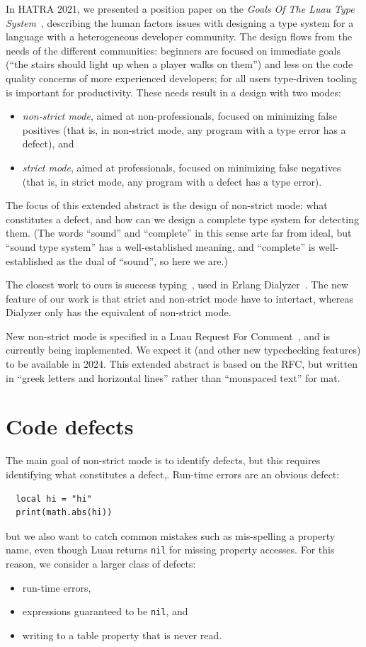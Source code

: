 \documentclass[sigplan]{acmart}
\begin{document}
In HATRA 2021, we presented a position paper on the \emph{Goals Of The Luau Type
System}~\cite{BFJ21:GoalsLuau}, describing the human factors issues
with designing a type system for a language with a heterogeneous
developer community. The design flows from the needs of the different
communities: beginners are focused on immediate goals (``the stairs
should light up when a player walks on them'') and less on the code
quality concerns of more experienced developers; for all users
type-driven tooling is important for productivity. These needs result in a design with two modes:
\begin{itemize}
\item \emph{non-strict mode}, aimed at non-professionals, focused on
  minimizing false positives (that is, in non-strict mode, any program with a type error has a defect), and
\item \emph{strict mode}, aimed at professionals, focused on
  minimizing false negatives (that is, in strict mode, any program with a defect has a type error).
\end{itemize}
The focus of this extended abstract is the design of non-strict mode: what constitutes
a defect, and how can we design a complete type system for detecting them.
(The words ``sound'' and ``complete'' in this sense arte far from ideal,
but ``sound type system'' has a well-established meaning, and ``complete''
is well-established as the dual of ``sound'', so here we are.)

The closest work to ours is success typing~\cite{SuccessTyping}, used
in Erlang Dialyzer~\cite{Dialyzer}.  The new feature of our work is
that strict and non-strict mode have to intertact, whereas Dialyzer only has
the equivalent of non-strict mode.

New non-strict mode is specified in a Luau Request For
Comment~\cite{NewNonStrictRFC}, and is currently being implemented.
We expect it (and other new typechecking features) to be available in
2024. This extended abstract is based on the RFC, but written in
``greek letters and horizontal lines'' rather than ``monspaced text''
for mat.

\section{Code defects}

The main goal of non-strict mode is to identify defects, but this requires
identifying what constitutes a defect,. Run-time errors are an obvious defect:
\begin{verbatim}
  local hi = "hi"
  print(math.abs(hi))
\end{verbatim}
but we also want to catch common mistakes such as mis-spelling a property name,
even though Luau returns \verb|nil| for missing property accesses.
For this reason, we consider a larger class of defects:
\begin{itemize}
\item run-time errors,
\item expressions guaranteed to be \verb|nil|, and
\item writing to a table property that is never read.
\end{itemize}
\end{document}
